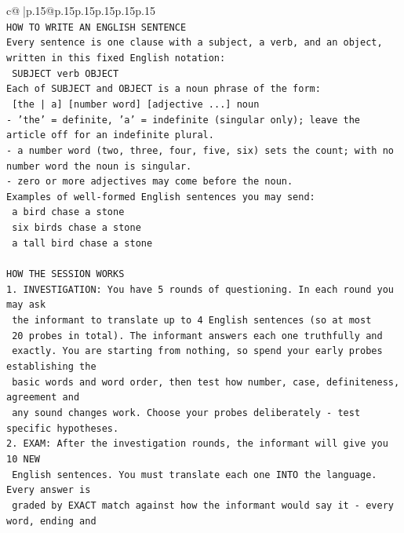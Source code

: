 \documentclass{article}
\begin{document}
{\begin{supertabular}{c@{$\;$}|p{.15\linewidth}@{}p{.15\linewidth}p{.15\linewidth}p{.15\linewidth}p{.15\linewidth}p{.15\linewidth}}
{{{\\ 
\texttt{HOW TO WRITE AN ENGLISH SENTENCE} \\
\texttt{Every sentence is one clause with a subject, a verb, and an object, written in this fixed English notation:} \\
\texttt{    SUBJECT  verb  OBJECT} \\
\texttt{Each of SUBJECT and OBJECT is a noun phrase of the form:} \\
\texttt{    {[}the | a{]}  {[}number word{]}  {[}adjective ...{]}  noun} \\
\texttt{{-} 'the' = definite, 'a' = indefinite (singular only); leave the article off for an indefinite plural.} \\
\texttt{{-} a number word (two, three, four, five, six) sets the count; with no number word the noun is singular.} \\
\texttt{{-} zero or more adjectives may come before the noun.} \\
\texttt{Examples of well{-}formed English sentences you may send:} \\
\texttt{    a bird chase a stone} \\
\texttt{    six birds chase a stone} \\
\texttt{    a tall bird chase a stone} \\
\\ 
\texttt{HOW THE SESSION WORKS} \\
\texttt{1. INVESTIGATION: You have 5 rounds of questioning. In each round you may ask} \\
\texttt{   the informant to translate up to 4 English sentences (so at most} \\
\texttt{   20 probes in total). The informant answers each one truthfully and} \\
\texttt{   exactly. You are starting from nothing, so spend your early probes establishing the} \\
\texttt{   basic words and word order, then test how number, case, definiteness, agreement and} \\
\texttt{   any sound changes work. Choose your probes deliberately {-} test specific hypotheses.} \\
\texttt{2. EXAM: After the investigation rounds, the informant will give you 10 NEW} \\
\texttt{   English sentences. You must translate each one INTO the language. Every answer is} \\
\texttt{   graded by EXACT match against how the informant would say it {-} every word, ending and} \\
}}}
\end{supertabular}}
\end{document}
